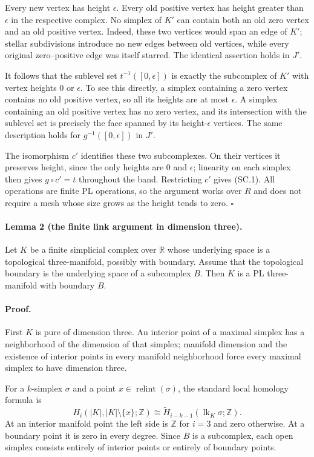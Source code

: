 Every new vertex has height $\epsilon$. Every old positive vertex has height
greater than $\epsilon$ in the respective complex. No simplex of $K'$ can
contain both an old zero vertex and an old positive vertex. Indeed, these two
vertices would span an edge of $K'$; stellar subdivisions introduce no new
edges between old vertices, while every original zero--positive edge was
itself starred. The identical assertion holds in $J'$.

It follows that the sublevel set $t^{-1}([0,\epsilon])$ is exactly the
subcomplex of $K'$ with vertex heights $0$ or $\epsilon$. To see this
directly, a simplex containing a zero vertex contains no old positive vertex,
so all its heights are at most $\epsilon$. A simplex containing an old
positive vertex has no zero vertex, and its intersection with the sublevel
set is precisely the face spanned by its height-$\epsilon$ vertices.
The same description holds for $g^{-1}([0,\epsilon])$ in $J'$.

The isomorphism $c'$ identifies these two subcomplexes. On their vertices it
preserves height, since the only heights are $0$ and $\epsilon$; linearity
on each simplex then gives $g\circ c'=t$ throughout the band. Restricting
$c'$ gives (SC.1). All operations are finite PL operations, so the argument
works over $R$ and does not require a mesh whose size grows as the height
tends to zero. \hfill$\square$

\paragraph{Lemma 2 (the finite link argument in dimension three).}
Let $K$ be a finite simplicial complex over $\mathbb R$ whose underlying
space is a topological three-manifold, possibly with boundary. Assume that
the topological boundary is the underlying space of a subcomplex $B$.
Then $K$ is a PL three-manifold with boundary $B$.

\paragraph{Proof.}
First $K$ is pure of dimension three. An interior point of a maximal simplex
has a neighborhood of the dimension of that simplex; manifold dimension
and the existence of interior points in every manifold neighborhood force
every maximal simplex to have dimension three.

For a $k$-simplex $\sigma$ and a point $x\in\operatorname{relint}(\sigma)$,
the standard local homology formula is
\[
 H_i(|K|,|K|\setminus\{x\};\mathbb Z)
 \cong
 \widetilde H_{i-k-1}(\operatorname{lk}_K\sigma;\mathbb Z).
 \tag{SC.3}
\]
At an interior manifold point the left side is $\mathbb Z$ for $i=3$ and
zero otherwise. At a boundary point it is zero in every degree. Since $B$
is a subcomplex, each open simplex consists entirely of interior points or
entirely of boundary points.

